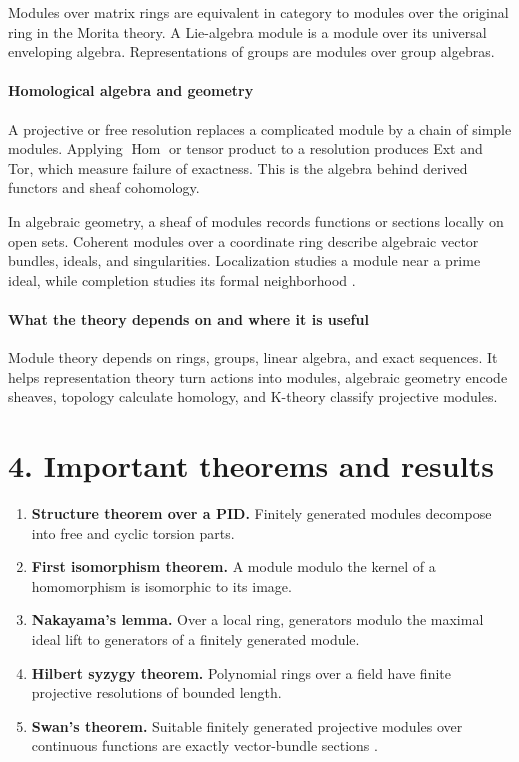 Modules over matrix rings are equivalent in category to modules over the original ring in the Morita theory. A Lie-algebra module is a module over its universal enveloping algebra. Representations of groups are modules over group algebras.

\paragraph{Homological algebra and geometry}
A projective or free resolution replaces a complicated module by a chain of simple modules. Applying $\operatorname{Hom}$ or tensor product to a resolution produces Ext and Tor, which measure failure of exactness. This is the algebra behind derived functors and sheaf cohomology.

In algebraic geometry, a sheaf of modules records functions or sections locally on open sets. Coherent modules over a coordinate ring describe algebraic vector bundles, ideals, and singularities. Localization studies a module near a prime ideal, while completion studies its formal neighborhood \cite{module_theory_ref2}.

\paragraph{What the theory depends on and where it is useful}
Module theory depends on rings, groups, linear algebra, and exact sequences. It helps representation theory turn actions into modules, algebraic geometry encode sheaves, topology calculate homology, and K-theory classify projective modules.

\section*{4. Important theorems and results}
\begin{enumerate}[leftmargin=*,itemsep=0.35em]
\item \textbf{Structure theorem over a PID.} Finitely generated modules decompose into free and cyclic torsion parts.

\item \textbf{First isomorphism theorem.} A module modulo the kernel of a homomorphism is isomorphic to its image.

\item \textbf{Nakayama's lemma.} Over a local ring, generators modulo the maximal ideal lift to generators of a finitely generated module.

\item \textbf{Hilbert syzygy theorem.} Polynomial rings over a field have finite projective resolutions of bounded length.

\item \textbf{Swan's theorem.} Suitable finitely generated projective modules over continuous functions are exactly vector-bundle sections \cite{module_theory_ref3}.
\end{enumerate}

